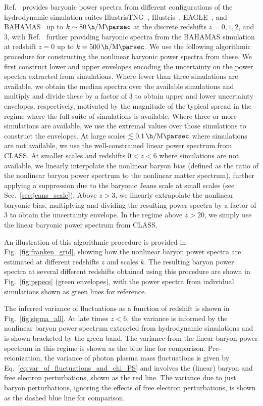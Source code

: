 \documentclass[prd,aps,10pt,nofootinbib,twocolumn,superscriptaddress,preprintnumbers,balancelastpage,longbibliography]{revtex4-1}
\begin{document}
Ref.~\cite{Foreman:2019ahr} provides baryonic power spectra from different configurations of the hydrodynamic simulation suites IllustrisTNG~\cite{Nelson:2018uso}, Illustris~\cite{Genel:2014lma}, EAGLE~\cite{McAlpine:2015tma}, and BAHAMAS~\cite{McCarthy:2016mry} up to $k \sim \SI{80}{\h\per\mega\parsec}$ at the discrete redshifts $z=0,1,2$, and $3$, with Ref.~\cite{vanDaalen:2019pst} further providing baryonic spectra from the BAHAMAS simulation at redshift $z=0$ up to $k = \SI{500}{\h\per\mega\parsec}$. We use the following algorithmic procedure for constructing the nonlinear baryonic power spectra from these. We first construct lower and upper envelopes encoding the uncertainty on the power spectra extracted from simulations. Where fewer than three simulations are available, we obtain the median spectra over the available simulations and multiply and divide these by a factor of 3 to obtain upper and lower uncertainty envelopes, respectively, motivated by the magnitude of the typical spread in the regime where the full suite of simulations is available. Where three or more simulations are available, we use the extremal values over those simulations to construct the envelopes. At large scales $\lesssim \SI{0.1}{\h\per\mega\parsec}$ where simulations are not available, we use the well-constrained linear power spectrum from CLASS\@. At smaller scales and redshifts $0 < z < 6$ where simulations are not available, we linearly interpolate the nonlinear baryon bias (defined as the ratio of the nonlinear baryon power spectrum to the nonlinear matter spectrum), further applying a suppression due to the baryonic Jeans scale at small scales (see Sec.~\ref{sec:jeans_scale}). Above $z > 3$, we linearly extrapolate the nonlinear baryonic bias, multiplying and dividing the resulting power spectra by a factor of 3 to obtain the uncertainty envelope. In the regime above $z > 20$, we simply use the linear baryonic power spectrum from CLASS.

An illustration of this algorithmic procedure is provided in Fig.~\ref{fig:franken_grid}, showing how the nonlinear baryon power spectra are estimated at different redshifts $z$ and scales $k$. The resulting baryon power spectra at several different redshifts obtained using this procedure are shown in Fig.~\ref{fig:pspecs} (green envelopes), with the power spectra from individual simulations shown as green lines for reference. 

The inferred variance of fluctuations as a function of redshift is shown in Fig.~\ref{fig:sigma_all}. At late times $z < 6$, the variance is informed by the nonlinear baryon power spectrum extracted from hydrodynamic simulations and is shown bracketed by the green band. The variance from the linear baryon power spectrum in this regime is shown as the blue line for comparison. Pre-reionization, the variance of photon plasma mass fluctuations is given by Eq.~\eqref{eq:var_of_fluctuations_and_chi_PS} and involves the (linear) baryon and free electron perturbations, shown as the red line. The variance due to just baryon perturbations, ignoring the effects of free electron perturbations, is shown as the dashed blue line for comparison.
\end{document}

